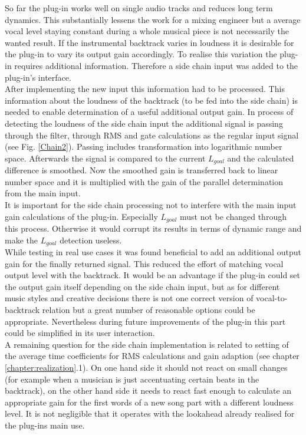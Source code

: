 So far the plug-in works well on single audio tracks and reduces long term dynamics. This substantially lessens the work for a mixing engineer but a average vocal level staying constant during a whole musical piece is not necessarily the wanted result. If the instrumental backtrack varies in loudness it is desirable for the plug-in to vary its output gain accordingly. To realise this variation the plug-in requires additional information. Therefore a side chain input was added to the plug-in's interface.\\
After implementing the new input this information had to be processed. This information about the loudness of the backtrack (to be fed into the side chain) is needed to enable determination of a useful additional output gain. In process of detecting the loudness of the side chain input the additional signal is passing through the filter, through RMS and gate calculations as the regular input signal (see Fig. \ref{Chain2}). Passing includes transformation into logarithmic number space. Afterwards the signal is compared to the current $L_{goal}$ and the calculated difference is smoothed. Now the smoothed gain is transferred back to linear number space and it is multiplied with the gain of the parallel determination from the main input.\\
It is important for the side chain processing not to interfere with the main input gain calculations of the plug-in. Especially $L_{goal}$ must not be changed through this process. Otherwise it would corrupt its results in terms of dynamic range and make the $L_{goal}$ detection useless.\\
While testing in real use cases it was found beneficial to add an additional output gain for the finally returned signal. This reduced the effort of matching vocal output level with the backtrack. It would be an advantage if the plug-in could set the output gain itself depending on the side chain input, but as for different music styles and creative decisions there is not one correct version of vocal-to-backtrack relation but a great number of reasonable options could be appropriate. Nevertheless during future improvements of the plug-in this part could be simplified in its user interaction.\\
A remaining question for the side chain implementation is related to setting of the average time coefficients for RMS calculations and gain adaption (see chapter \ref{chapter:realization}.1). On one hand side it should not react on small changes (for example when a musician is just accentuating certain beats in the backtrack), on the other hand side it needs to react fast enough to calculate an appropriate gain for the first words of a new song part with a different loudness level. It is not negligible that it operates with the lookahead already realised for the plug-ins main use.\\
